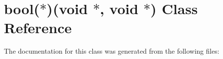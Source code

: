 \hypertarget{classbool_07_5_08_07void_01_5_00_01void_01_5_08}{}\section{bool($\ast$)(void $\ast$, void $\ast$) Class Reference}
\label{classbool_07_5_08_07void_01_5_00_01void_01_5_08}


The documentation for this class was generated from the following files\+: